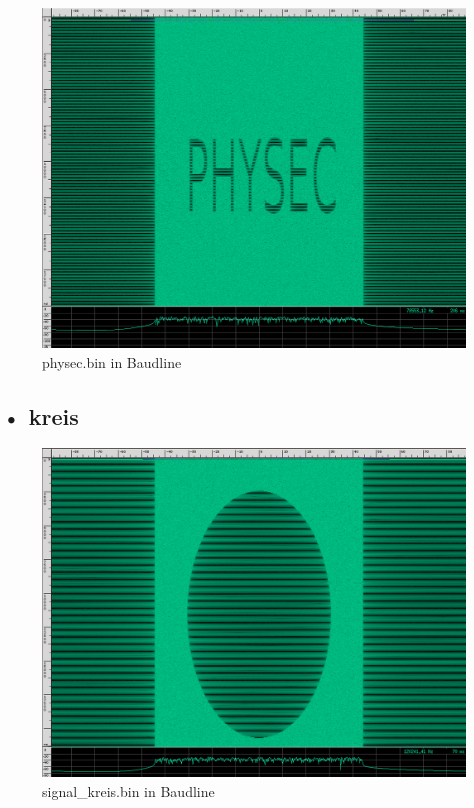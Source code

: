 \documentclass[12pt,a4paper]{article}
\begin{document}
\begin{figure}[hbt!]
	\centering
		\includegraphics[width=1\textwidth ]
		{Bilder/A2_physec.png}
		\caption{physec.bin in Baudline}
\end{figure}



\newpage
\subsection*{• kreis}

\begin{figure}[hbt!]
	\centering
		\includegraphics[width=1\textwidth ]
		{Bilder/A2_kreis.png}
		\caption{signal\_kreis.bin in Baudline}
\end{figure}
\end{document}
